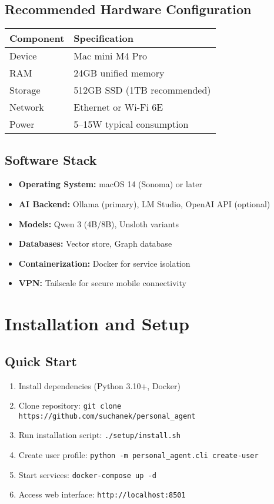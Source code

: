 \documentclass[11pt,letterpaper]{article}
\begin{document}
\subsection{Recommended Hardware Configuration}

\begin{tabular}{ll}
\textbf{Component} & \textbf{Specification} \\
\hline
Device & Mac mini M4 Pro \\
RAM & 24GB unified memory \\
Storage & 512GB SSD (1TB recommended) \\
Network & Ethernet or Wi-Fi 6E \\
Power & 5--15W typical consumption \\
\end{tabular}

\subsection{Software Stack}

\begin{itemize}
\item \textbf{Operating System:} macOS 14 (Sonoma) or later
\item \textbf{AI Backend:} Ollama (primary), LM Studio, OpenAI API (optional)
\item \textbf{Models:} Qwen 3 (4B/8B), Unsloth variants
\item \textbf{Databases:} Vector store, Graph database
\item \textbf{Containerization:} Docker for service isolation
\item \textbf{VPN:} Tailscale for secure mobile connectivity
\end{itemize}

\section{Installation and Setup}

\subsection{Quick Start}

\begin{enumerate}
\item Install dependencies (Python 3.10+, Docker)
\item Clone repository: \texttt{git clone https://github.com/suchanek/personal\_agent}
\item Run installation script: \texttt{./setup/install.sh}
\item Create user profile: \texttt{python -m personal\_agent.cli create-user}
\item Start services: \texttt{docker-compose up -d}
\item Access web interface: \texttt{http://localhost:8501}
\end{enumerate}
\end{document}
